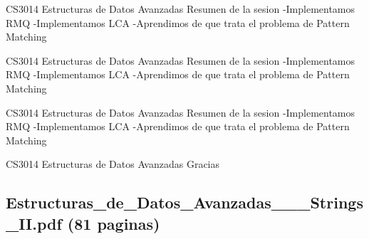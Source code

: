 \begin{description}[leftmargin=!,labelwidth=4.2em,style=nextline]
\item[Pag. 32] CS3014 Estructuras de Datos Avanzadas Resumen de la sesion -Implementamos RMQ -Implementamos LCA -Aprendimos de que trata el problema de Pattern Matching
\item[Pag. 33] CS3014 Estructuras de Datos Avanzadas Resumen de la sesion -Implementamos RMQ -Implementamos LCA -Aprendimos de que trata el problema de Pattern Matching
\item[Pag. 34] CS3014 Estructuras de Datos Avanzadas Resumen de la sesion -Implementamos RMQ -Implementamos LCA -Aprendimos de que trata el problema de Pattern Matching
\item[Pag. 35] CS3014 Estructuras de Datos Avanzadas Gracias
\end{description}
\subsection*{Estructuras\_de\_Datos\_Avanzadas\_\_\_Strings\_II.pdf (81 paginas)}
